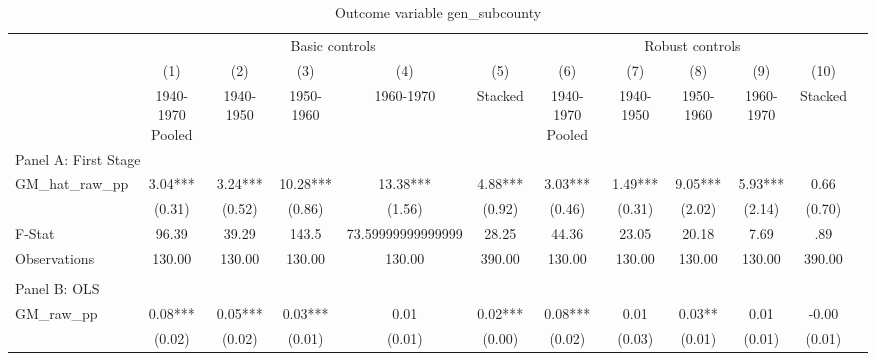  \begin{table}[htbp]\centering {} \begin{threeparttable} \caption{Outcome variable gen\_subcounty} \begin{tabular}{l*{11}{c}} \toprule
          &\multicolumn{5}{c}{Basic controls}                                   &\multicolumn{5}{c}{Robust controls}                                  \\\cmidrule(lr){2-6}\cmidrule(lr){7-11}
          &\multicolumn{1}{c}{(1)}&\multicolumn{1}{c}{(2)}&\multicolumn{1}{c}{(3)}&\multicolumn{1}{c}{(4)}&\multicolumn{1}{c}{(5)}&\multicolumn{1}{c}{(6)}&\multicolumn{1}{c}{(7)}&\multicolumn{1}{c}{(8)}&\multicolumn{1}{c}{(9)}&\multicolumn{1}{c}{(10)}\\
          &\multicolumn{1}{c}{1940-1970 Pooled}&\multicolumn{1}{c}{1940-1950}&\multicolumn{1}{c}{1950-1960}&\multicolumn{1}{c}{1960-1970}&\multicolumn{1}{c}{Stacked}&\multicolumn{1}{c}{1940-1970 Pooled}&\multicolumn{1}{c}{1940-1950}&\multicolumn{1}{c}{1950-1960}&\multicolumn{1}{c}{1960-1970}&\multicolumn{1}{c}{Stacked}\\
\cmidrule(lr){1-11}
\multicolumn{10}{l}{Panel A: First Stage}\\
\cmidrule(lr){1-11}
GM\_hat\_raw\_pp&      3.04***&      3.24***&     10.28***&     13.38***&      4.88***&      3.03***&      1.49***&      9.05***&      5.93***&      0.66   \\
          &    (0.31)   &    (0.52)   &    (0.86)   &    (1.56)   &    (0.92)   &    (0.46)   &    (0.31)   &    (2.02)   &    (2.14)   &    (0.70)   \\
\midrule
F-Stat    &     96.39   &     39.29   &     143.5   &73.59999999999999   &     28.25   &     44.36   &     23.05   &     20.18   &      7.69   &       .89   \\
Observations&    130.00   &    130.00   &    130.00   &    130.00   &    390.00   &    130.00   &    130.00   &    130.00   &    130.00   &    390.00   \\
\cmidrule[\heavyrulewidth](lr){1-11} \\ \cmidrule[\heavyrulewidth](lr){1-11}
\multicolumn{10}{l}{Panel B: OLS}\\
\cmidrule(lr){1-11}
GM\_raw\_pp &      0.08***&      0.05***&      0.03***&      0.01   &      0.02***&      0.08***&      0.01   &      0.03** &      0.01   &     -0.00   \\
          &    (0.02)   &    (0.02)   &    (0.01)   &    (0.01)   &    (0.00)   &    (0.02)   &    (0.03)   &    (0.01)   &    (0.01)   &    (0.01)   \\

\end{tabular}
\end{threeparttable}
\end{table}
